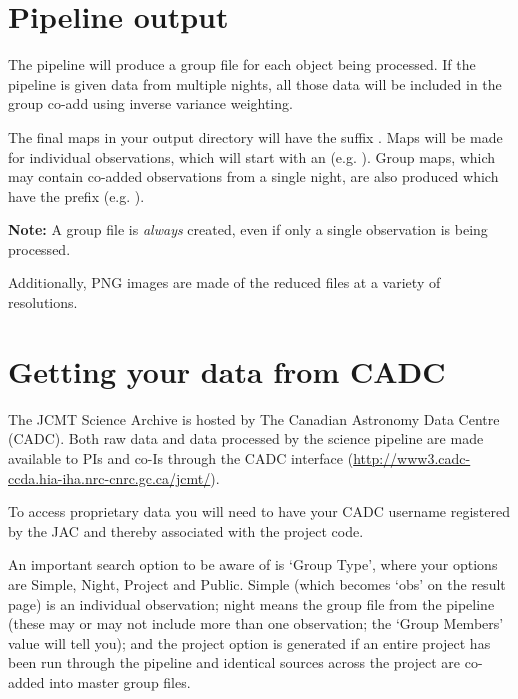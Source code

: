 \documentclass[11pt,oneside,chapters]{starlink}
\begin{document}
\section{Pipeline output}

The pipeline will produce a group file for each object being
processed. If the pipeline is given data from multiple nights, all
those data will be included in the group co-add using inverse variance
weighting.

The final maps in your output directory will have the suffix
. Maps will be made for individual observations,
which will start with an  (e.g.
). Group maps, which may contain
co-added observations from a single night, are also produced which
have the prefix  (e.g. ).

\textbf{Note:} A group file is \emph{always} created, even if only a single
observation is being processed.

Additionally, PNG images are made of the reduced files at a variety of
resolutions.

\section{Getting your data from CADC}

The JCMT Science Archive is hosted by The Canadian Astronomy Data
Centre (CADC). Both raw data and data processed by the science pipeline
are made available to PIs and co-Is through the CADC interface
(\url{http://www3.cadc-ccda.hia-iha.nrc-cnrc.gc.ca/jcmt/}).

To access proprietary data you will need to have your CADC username
registered by the JAC and thereby associated with the project code.

An important search option to be aware of is `Group Type', where your
options are Simple, Night, Project and Public. Simple (which becomes
`obs' on the result page) is an individual observation; night means
the group file from the pipeline (these may or may not include more
than one observation; the `Group Members' value will tell you); and the
project option is generated if an entire project has been run through
the pipeline and identical sources across the project are co-added
into master group files.
\end{document}
